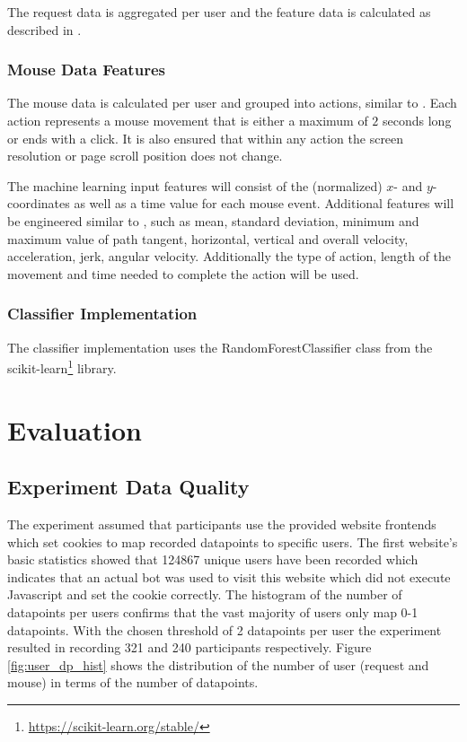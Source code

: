 \documentclass[
    fontsize=12pt,
    headings=small,
    parskip=half,           %
    bibliography=totoc,
    numbers=noenddot,       %
    open=any,               %
    final                   %
]{scrreprt}
\begin{document}
The request data is aggregated per user  and the feature data is calculated as described in .

\subsection{Mouse Data Features}

The mouse data is calculated per user and grouped into actions, similar to \cite{}. Each action represents a mouse movement that is either a maximum of $2$ seconds long or ends with a click. It is also ensured that within any action the screen resolution or page scroll position does not change.


The machine learning input features will consist of the (normalized) $x$- and $y$-coordinates as well as a time value for each mouse event. Additional features will be engineered similar to \cite{https://doi.org/10.1049/iet-bmt.2018.5126}, such as mean, standard deviation, minimum and maximum value of path tangent, horizontal, vertical and overall velocity, acceleration, jerk, angular velocity. Additionally the type of action, length of the movement and time needed to complete the action will be used.
\todo

\subsection{Classifier Implementation}

The classifier implementation uses the RandomForestClassifier class from the scikit-learn\footnote{\url{https://scikit-learn.org/stable/}} library.



\chapter{Evaluation}

\section{Experiment Data Quality}

The experiment assumed that participants use the provided website frontends which set cookies to map recorded datapoints to specific users. The first website's basic statistics showed that 124867 unique users have been recorded which indicates that an actual bot was used to visit this website which did not execute Javascript and set the cookie correctly. The histogram of the number of datapoints per users confirms that the vast majority of users only map 0-1 datapoints. With the chosen threshold of 2 datapoints per user the experiment resulted in recording 321 and 240 participants respectively. Figure \ref{fig:user_dp_hist} shows the distribution of the number of user (request and mouse) in terms of the number of datapoints.
\end{document}
